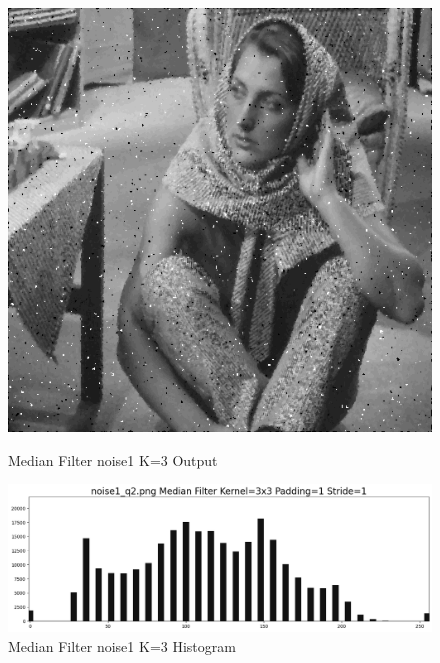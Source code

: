 \documentclass[12pt,a4paper]{report}
\begin{document}
\begin{figure}[!htb]
  \includegraphics[width=1\linewidth]{output/noise1_q2_K3P1.png}
  \caption{Median Filter noise1 K=3 Output}
  \includegraphics[width=1\linewidth]{output/noise1_q2_K3P1_his.png}
  \caption{Median Filter noise1 K=3 Histogram}
\end{figure}
\end{document}
